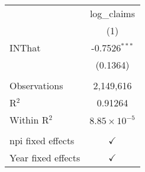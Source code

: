 
\begingroup
\centering
\begin{tabular}{lc}
   \toprule
                      & log\_claims\\   
                      & (1)\\  
   \midrule 
   INThat             & -0.7526$^{***}$\\   
                      & (0.1364)\\   
    \\
   Observations       & 2,149,616\\  
   R$^2$              & 0.91264\\  
   Within R$^2$       & $8.85\times 10^{-5}$\\   
    \\
   npi fixed effects  & $\checkmark$\\   
   Year fixed effects & $\checkmark$\\   
   \bottomrule
\end{tabular}
\par\endgroup


